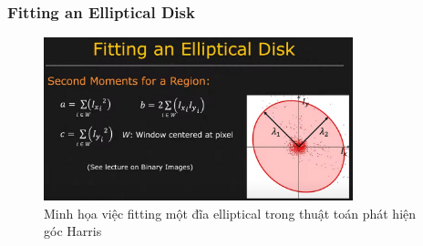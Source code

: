 \documentclass[12pt]{article}
\begin{document}
\subsubsection{Fitting an Elliptical Disk}
\begin{figure}[htbp]
    \centering
    \includegraphics[width=0.8\textwidth]{img/fitting_an_elliptical_disk.jpg}
    \caption{Minh họa việc fitting một đĩa elliptical trong thuật toán phát hiện góc Harris \cite{harris_youtube}}
    \label{fig:elliptical_disk}
\end{figure}
\end{document}
